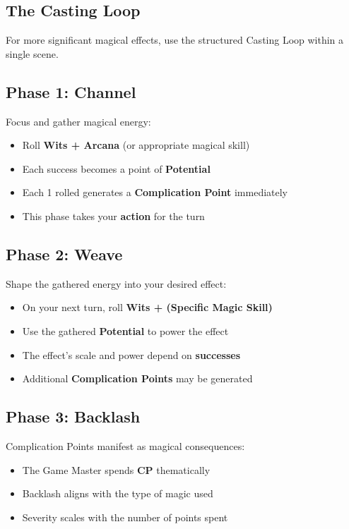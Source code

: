 \begin{multicols}{2}
\section{The Casting Loop} 

For more significant magical effects, use the structured Casting Loop within a single scene.

\subsection*{Phase 1: Channel} 
Focus and gather magical energy:
\begin{itemize}
\item Roll \textbf{Wits + Arcana} (or appropriate magical skill)
\item Each success becomes a point of \textbf{Potential}
\item Each 1 rolled generates a \textbf{Complication Point} immediately
\item This phase takes your \textbf{action} for the turn
\end{itemize}

\subsection*{Phase 2: Weave} 
Shape the gathered energy into your desired effect:
\begin{itemize}
\item On your next turn, roll \textbf{Wits + (Specific Magic Skill)}
\item Use the gathered \textbf{Potential} to power the effect
\item The effect's scale and power depend on \textbf{successes}
\item Additional \textbf{Complication Points} may be generated
\end{itemize}

\subsection*{Phase 3: Backlash} 
Complication Points manifest as magical consequences:
\begin{itemize}
\item The Game Master spends \textbf{CP} thematically
\item Backlash aligns with the type of magic used
\item Severity scales with the number of points spent
\end{itemize}


\end{multicols}
